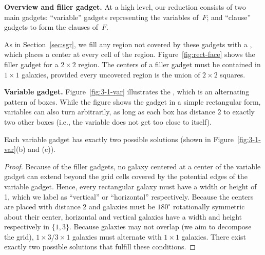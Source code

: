 
\textbf{Overview and filler gadget.}
At a high level, our reduction consists of two main gadgets:
``variable'' gadgets representing the variables of~$F$;
and ``clause'' gadgets to form the clauses of~$F$.

As in Section~\ref{sec:sgr}, we fill any region not covered by these gadgets
with a , which places a center at every cell of the region.
Figure~\ref{fig:rect-face} shows the filler gadget for a $2 \times 2$ region.
The centers of a filler gadget must be contained in $1 \times 1$ galaxies,
provided every uncovered region is the union of $2 \times 2$ squares.

\textbf{Variable gadget.}
Figure~\ref{fig:3-1-var} illustrates the ,
which is an alternating pattern of boxes.
While the figure shows the gadget in a simple rectangular form,
variables can also turn arbitrarily, as long as each box has
distance $2$ to exactly two other boxes (i.e., the variable does not
get too close to itself).

\begin{lemma}\label{var-1-3-only-2-sols}
Each variable gadget has exactly two possible solutions (shown in Figure~\ref{fig:3-1-var}(b) and (c)).
\end{lemma}
\begin{proof}
Because of the filler gadgets, no galaxy centered at a center
of the variable gadget can extend beyond the grid cells
covered by the potential edges of the variable gadget.
Hence, every rectangular galaxy must have a width or height of 1,
which we label as ``vertical'' or ``horizontal'' respectively.
Because the centers are placed with distance 2 and galaxies must be
$180^\circ$ rotationally symmetric about their center,
horizontal and vertical galaxies have a width and height respectively
in $\{1,3\}$.
Because galaxies may not overlap (we aim to decompose the grid),
$1\times 3$/$3\times 1$ galaxies must alternate with $1 \times 1$ galaxies.
There exist exactly two possible solutions that fulfill these conditions.%
\end{proof}

